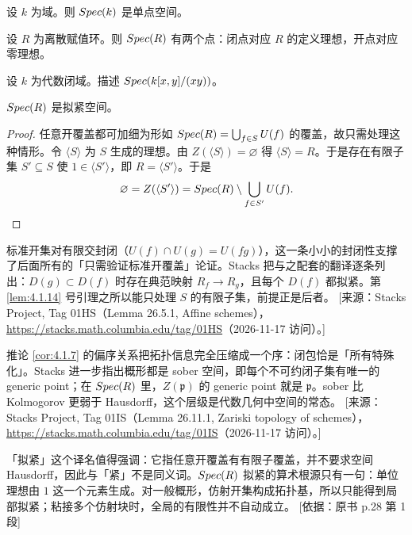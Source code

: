 \begin{example}\label{ex:4.1.11}
设 $k$ 为域。则 $Spec(k)$ 是单点空间。
\end{example}

\begin{example}\label{ex:4.1.12}
设 $R$ 为离散赋值环。则 $Spec(R)$ 有两个点：闭点对应 $R$ 的定义理想，开点对应零理想。
\end{example}

\begin{exercise}\label{exc:4.1.13}
设 $k$ 为代数闭域。描述 $Spec(k[x,y]/(xy))$。
\end{exercise}

\begin{lemma}\label{lem:4.1.14}
$Spec(R)$ 是拟紧空间。
\end{lemma}

\begin{proof}
任意开覆盖都可加细为形如 $Spec(R) = \bigcup_{f \in S} U(f)$ 的覆盖，故只需处理这种情形。令 $\langle S\rangle$ 为 $S$ 生成的理想。由 $Z(\langle S\rangle) = \varnothing$ 得 $\langle S\rangle = R$。于是存在有限子集 $S' \subseteq S$ 使 $1 \in \langle S'\rangle$，即 $R = \langle S'\rangle$。于是
\[
\varnothing = Z(\langle S'\rangle) = Spec(R) \setminus \bigcup_{f \in S'} U(f).
\]
\end{proof}

\begin{yizhu}
标准开集对有限交封闭（$U(f)\cap U(g)=U(fg)$），这一条小小的封闭性支撑了后面所有的「只需验证标准开覆盖」论证。Stacks 把与之配套的翻译逐条列出：$D(g)\subset D(f)$ 时存在典范映射 $R_f\to R_g$，且每个 $D(f)$ 都拟紧。第 \ref{lem:4.1.14} 号引理之所以能只处理 $S$ 的有限子集，前提正是后者。
[来源：Stacks Project, Tag 01HS（Lemma 26.5.1, Affine schemes），\url{https://stacks.math.columbia.edu/tag/01HS}（2026-11-17 访问）。]
\end{yizhu}

\begin{yizhu}
推论 \ref{cor:4.1.7} 的偏序关系把拓扑信息完全压缩成一个序：闭包恰是「所有特殊化」。Stacks 进一步指出概形都是 sober 空间，即每个不可约闭子集有唯一的 generic point；在 $Spec(R)$ 里，$Z(\mathfrak p)$ 的 generic point 就是 $\mathfrak p$。sober 比 Kolmogorov 更弱于 Hausdorff，这个层级是代数几何中空间的常态。
[来源：Stacks Project, Tag 01IS（Lemma 26.11.1, Zariski topology of schemes），\url{https://stacks.math.columbia.edu/tag/01IS}（2026-11-17 访问）。]
\end{yizhu}

\begin{yizhu}
「拟紧」这个译名值得强调：它指任意开覆盖有有限子覆盖，并不要求空间 Hausdorff，因此与「紧」不是同义词。$Spec(R)$ 拟紧的算术根源只有一句：单位理想由 $1$ 这一个元素生成。对一般概形，仿射开集构成拓扑基，所以只能得到局部拟紧；粘接多个仿射块时，全局的有限性并不自动成立。
[依据：原书 p.28 第 1 段]
\end{yizhu}

